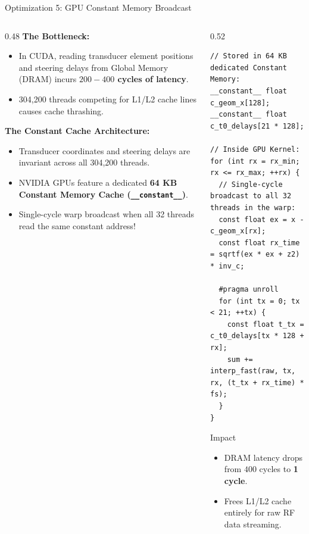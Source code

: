 \documentclass[aspectratio=169,10pt]{beamer}
\begin{document}
\begin{frame}[fragile]{Optimization 5: GPU Constant Memory Broadcast}
  \begin{columns}[T]
    \begin{column}{0.48\textwidth}
      \textbf{\small The Bottleneck:}
      \scriptsize
      \begin{itemize}
        \item In CUDA, reading transducer element positions and steering delays from Global Memory (DRAM) incurs \textbf{$200-400$ cycles of latency}.
        \item 304,200 threads competing for L1/L2 cache lines causes cache thrashing.
      \end{itemize}
      \textbf{\small The Constant Cache Architecture:}
      \scriptsize
      \begin{itemize}
        \item Transducer coordinates and steering delays are invariant across all 304,200 threads.
        \item NVIDIA GPUs feature a dedicated \textbf{64 KB Constant Memory Cache (\texttt{\_\_constant\_\_})}.
        \item Single-cycle warp broadcast when all 32 threads read the same constant address!
      \end{itemize}
    \end{column}
    \begin{column}{0.52\textwidth}
\begin{lstlisting}[caption={Constant Cache Broadcast Kernel}]
// Stored in 64 KB dedicated Constant Memory:
__constant__ float c_geom_x[128];
__constant__ float c_t0_delays[21 * 128];

// Inside GPU Kernel:
for (int rx = rx_min; rx <= rx_max; ++rx) {
  // Single-cycle broadcast to all 32 threads in the warp:
  const float ex = x - c_geom_x[rx];
  const float rx_time = sqrtf(ex * ex + z2) * inv_c;

  #pragma unroll
  for (int tx = 0; tx < 21; ++tx) {
    const float t_tx = c_t0_delays[tx * 128 + rx];
    sum += interp_fast(raw, tx, rx, (t_tx + rx_time) * fs);
  }
}
\end{lstlisting}
      \begin{block}{Impact}
        \scriptsize
        \begin{itemize}
          \item DRAM latency drops from $400$ cycles to \textbf{1 cycle}.
          \item Frees L1/L2 cache entirely for raw RF data streaming.
        \end{itemize}
      \end{block}
    \end{column}
  \end{columns}
\end{frame}
\end{document}
